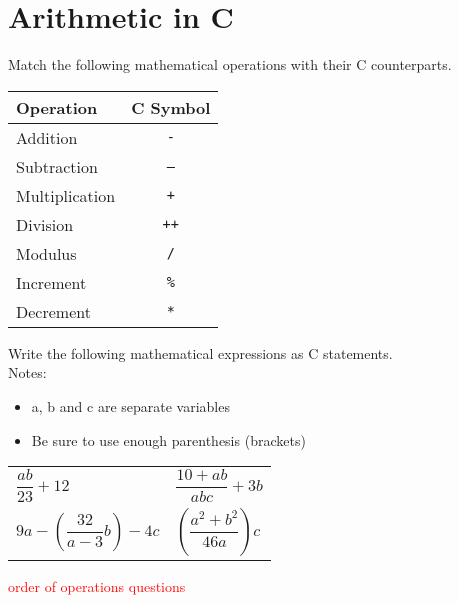 \documentclass{pass}
\begin{document}
\section*{Arithmetic in C}
\begin{enumerate}[resume]
\item Match the following mathematical operations with their C counterparts.
	\begin{center}
	\begin{tabular}{|l|c|} \hline
	\textbf{Operation} & \textbf{C Symbol} \\ \hline
	Addition & \texttt{-}\\
	Subtraction & \texttt{--}\\
	Multiplication & \texttt{+}\\
	Division & \texttt{++}\\
	Modulus & \texttt{/}\\
	Increment & \texttt{\%}\\
	Decrement & \texttt{*}\\ \hline
	\end{tabular}
	\end{center}

\item Write the following mathematical expressions as C statements.\\ 
Notes:
	\begin{itemize}
	\item a, b and c are separate variables
	\item Be sure to use enough parenthesis (brackets)
	\end{itemize}
	\begin{enumerate}
	\begin{tabularx}{\textwidth}{XX}
        \item $\dfrac{ab}{23} + 12$ &
        \item $\dfrac{10+ab}{abc} + 3b$ \\
        \item $9a - \left(\dfrac{32}{a-3}b\right) - 4c$ &
        \item $\left(\dfrac{a^2+b^2}{46a}\right)c$ \\
	\end{tabularx}
	\end{enumerate}
	
\textcolor{red}{\item order of operations questions}

\end{enumerate}
\end{document}
